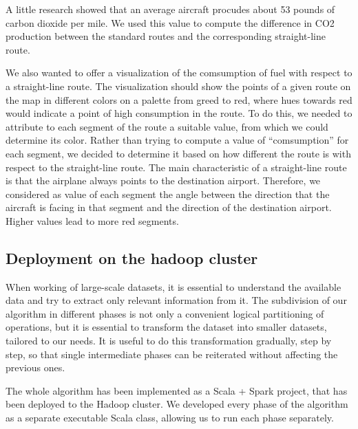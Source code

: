 \documentclass{vldb}
\begin{document}
A little research showed that an average aircraft procudes about 53 pounds of
carbon dioxide per mile. We used this value to compute the difference in CO2
production between the standard routes and the corresponding straight-line
route.

We also wanted to offer a visualization of the comsumption of fuel with respect
to a straight-line route. The visualization should show the points of a given
route on the map in different colors on a palette from greed to red, where hues
towards red would indicate a point of high consumption in the route.
To do this, we needed to attribute to each segment of the route a suitable value,
from which we could determine its color. Rather than trying to compute a value
of ``comsumption'' for each segment, we decided to determine it based on
how different the route is with respect to the straight-line route. The main
characteristic of a straight-line route is that the airplane always points to
the destination airport. Therefore, we considered as value of each segment the
angle between the direction that the aircraft is facing in that segment and the
direction of the destination airport. Higher values lead to more red segments.

\subsection{Deployment on the hadoop cluster}

When working of large-scale datasets, it is essential to understand the
available data and try to extract only relevant information from it. The
subdivision of our algorithm in different phases is not only a convenient
logical partitioning of operations, but it is essential to transform the dataset
into smaller datasets, tailored to our needs. It is useful to do this
transformation gradually, step by step, so that single intermediate phases can
be reiterated without affecting the previous ones.

The whole algorithm has been implemented as a Scala + Spark project, that has
been deployed to the Hadoop cluster. We developed every phase of the algorithm
as a separate executable Scala class, allowing us to run each phase separately.
\end{document}

